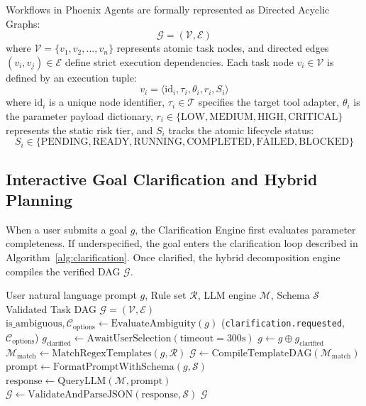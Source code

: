 \documentclass[conference]{IEEEtran}
\begin{document}
Workflows in Phoenix Agents are formally represented as Directed Acyclic Graphs:
\begin{equation}
\mathcal{G} = (\mathcal{V}, \mathcal{E})
\end{equation}
where $\mathcal{V} = \{v_1, v_2, \dots, v_n\}$ represents atomic task nodes, and directed edges $(v_i, v_j) \in \mathcal{E}$ define strict execution dependencies. Each task node $v_i \in \mathcal{V}$ is defined by an execution tuple:
\begin{equation}
v_i = \langle \text{id}_i, \tau_i, \theta_i, r_i, S_i \rangle
\end{equation}
where $\text{id}_i$ is a unique node identifier, $\tau_i \in \mathcal{T}$ specifies the target tool adapter, $\theta_i$ is the parameter payload dictionary, $r_i \in \{\text{LOW}, \text{MEDIUM}, \text{HIGH}, \text{CRITICAL}\}$ represents the static risk tier, and $S_i$ tracks the atomic lifecycle status:
\begin{equation}
S_i \in \{\text{PENDING}, \text{READY}, \text{RUNNING}, \text{COMPLETED}, \text{FAILED}, \text{BLOCKED}\}
\end{equation}

\subsection{Interactive Goal Clarification and Hybrid Planning}
When a user submits a goal $g$, the Clarification Engine first evaluates parameter completeness. If underspecified, the goal enters the clarification loop described in Algorithm~\ref{alg:clarification}. Once clarified, the hybrid decomposition engine compiles the verified DAG $\mathcal{G}$.

\begin{algorithm}[htbp]
\caption{Interactive Goal Clarification \& Hybrid Decomposition}
\label{alg:clarification}
\begin{algorithmic}[1]
\REQUIRE User natural language prompt $g$, Rule set $\mathcal{R}$, LLM engine $\mathcal{M}$, Schema $\mathcal{S}$
\ENSURE Validated Task DAG $\mathcal{G} = (\mathcal{V}, \mathcal{E})$
\STATE $\text{is\_ambiguous}, \mathcal{C}_{\text{options}} \leftarrow \text{EvaluateAmbiguity}(g)$
    \STATE {}(\texttt{clarification.requested}, $\mathcal{C}_{\text{options}}$)
    \STATE $g_{\text{clarified}} \leftarrow \text{AwaitUserSelection}(\text{timeout}=300\text{s})$
    \STATE $g \leftarrow g \oplus g_{\text{clarified}}$
\ENDIF
\STATE $\mathcal{M}_{\text{match}} \leftarrow \text{MatchRegexTemplates}(g, \mathcal{R})$
    \STATE $\mathcal{G} \leftarrow \text{CompileTemplateDAG}(\mathcal{M}_{\text{match}})$
\ELSE
    \STATE $\text{prompt} \leftarrow \text{FormatPromptWithSchema}(g, \mathcal{S})$
    \STATE $\text{response} \leftarrow \text{QueryLLM}(\mathcal{M}, \text{prompt})$
    \STATE $\mathcal{G} \leftarrow \text{ValidateAndParseJSON}(\text{response}, \mathcal{S})$
\ENDIF
\RETURN $\mathcal{G}$
\end{algorithmic}
\end{algorithm}
\end{document}
